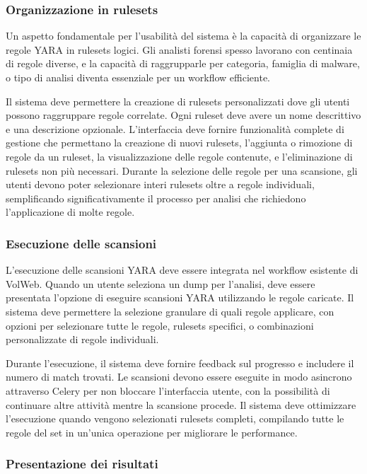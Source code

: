 \subsubsection{Organizzazione in rulesets}

Un aspetto fondamentale per l'usabilità del sistema è la capacità di organizzare le regole YARA in rulesets logici. Gli analisti forensi spesso lavorano con centinaia di regole diverse, e la capacità di raggrupparle per categoria, famiglia di malware, o tipo di analisi diventa essenziale per un workflow efficiente.

Il sistema deve permettere la creazione di rulesets personalizzati dove gli utenti possono raggruppare regole correlate. Ogni ruleset deve avere un nome descrittivo e una descrizione opzionale. L'interfaccia deve fornire funzionalità complete di gestione che permettano la creazione di nuovi rulesets, l'aggiunta o rimozione di regole da un ruleset, la visualizzazione delle regole contenute, e l'eliminazione di rulesets non più necessari. Durante la selezione delle regole per una scansione, gli utenti devono poter selezionare interi rulesets oltre a regole individuali, semplificando significativamente il processo per analisi che richiedono l'applicazione di molte regole.

\subsubsection{Esecuzione delle scansioni}

L'esecuzione delle scansioni YARA deve essere integrata nel workflow esistente di VolWeb. Quando un utente seleziona un dump per l'analisi, deve essere presentata l'opzione di eseguire scansioni YARA utilizzando le regole caricate. Il sistema deve permettere la selezione granulare di quali regole applicare, con opzioni per selezionare tutte le regole, rulesets specifici, o combinazioni personalizzate di regole individuali.

Durante l'esecuzione, il sistema deve fornire feedback sul progresso e includere il numero di match trovati. Le scansioni devono essere eseguite in modo asincrono attraverso Celery per non bloccare l'interfaccia utente, con la possibilità di continuare altre attività mentre la scansione procede. Il sistema deve ottimizzare l'esecuzione quando vengono selezionati rulesets completi, compilando tutte le regole del set in un'unica operazione per migliorare le performance.

\subsubsection{Presentazione dei risultati}

